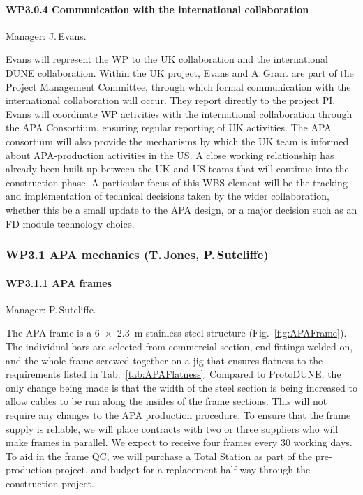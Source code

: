 \paragraph{WP3.0.4 Communication with the international collaboration}

Manager: J.\,Evans.

Evans will represent the WP to the UK collaboration and the international DUNE collaboration. Within the UK project, Evans and A.\,Grant are part of the Project Management Committee, through which formal communication with the international collaboration will occur. They report directly to the project PI. Evans will coordinate WP activities with the international collaboration through the APA Consortium, ensuring regular reporting of UK activities. The APA consortium will also provide the mechanisms by which the UK team is informed about APA-production activities in the US. A close working relationship has already been built up between the UK and US teams that will continue into the construction phase. A particular focus of this WBS element will be the tracking and implementation of technical decisions taken by the wider collaboration, whether this be a small update to the APA design, or a major decision such as an FD module technology choice.

\subsubsection{WP3.1 APA mechanics (T.\,Jones, P.\,Sutcliffe)}

\paragraph{WP3.1.1 APA frames} Manager: P.\,Sutcliffe.

The APA frame is a \SI{6x2.3}{\metre} stainless steel structure (Fig.~\ref{fig:APAFrame}). The individual bars are selected from commercial section, end fittings welded on, and the whole frame screwed together on a jig that ensures flatness to the requirements listed in Tab.~\ref{tab:APAFlatness}. Compared to ProtoDUNE, the only change being made is that the width of the steel section is being increased to allow cables to be run along the insides of the frame sections. This will not require any changes to the APA production procedure.  To ensure that the frame supply is reliable, we will place contracts with two or three suppliers who will make frames in parallel. We expect to receive four frames every 30 working days. To aid in the frame QC, we will purchase a Total Station as part of the pre-production project, and budget for a replacement half way through the construction project.

